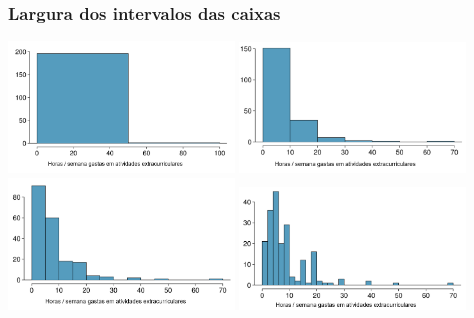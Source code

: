 \begin{frame}
\frametitle{Largura dos intervalos das caixas}
\justifying
{}

\begin{center}
\includegraphics[width=0.45\textwidth]{1-6_numerical_data/extracurr_hrs_hist2.png}
\includegraphics[width=0.45\textwidth]{1-6_numerical_data/extracurr_hrs_hist.png} \\
\includegraphics[width=0.45\textwidth]{1-6_numerical_data/extracurr_hrs_hist20.png}
\includegraphics[width=0.45\textwidth]{1-6_numerical_data/extracurr_hrs_hist30.png}
\end{center}

\end{frame}



